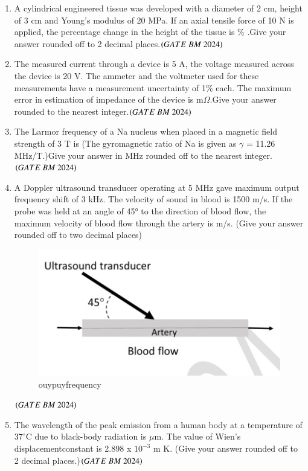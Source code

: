 \documentclass[journal,12pt,onecolumn]{IEEEtran}
\theoremstyle{remark}
\begin{document}
\begin{enumerate}
\item A cylindrical engineered tissue was developed with a diameter of 2 cm, height of 3 cm and Young's modulus of 20 MPa. If an axial tensile force of 10 N is applied, the percentage change in the height of the tissue is  \underline{\hspace{2cm}} \% .Give your answer
rounded off to 2 decimal places.\hfill $\brak{GATE\ BM\ 2024}$

\item The measured current through a device is 5 A, the voltage measured across the device is 20 V. The ammeter and the voltmeter used for these measurements have a measurement uncertainty of 1\% each. The maximum error in estimation of impedance of the device is\underline{\hspace{2cm}} m$\Omega$.Give your answer rounded to the nearest integer.\hfill $\brak{GATE\ BM\ 2024}$

\item The Larmor frequency of a Na nucleus when placed in a magnetic field strength of 3 T is  \underline{\hspace{2cm}} (The gyromagnetic ratio of Na is given as $\gamma$ = 11.26 MHz/T.)Give your answer in MHz rounded off to the nearest integer.\hfill $\brak{GATE\ BM\ 2024}$

\item A Doppler ultrasound transducer operating at 5 MHz gave maximum output frequency shift of 3 kHz. The velocity of sound in blood is 1500 m/s. If the probe was held at an angle of 45° to the direction of blood flow, the maximum velocity of blood flow through the artery is \underline{\hspace{2cm}}m/s. (Give your answer rounded off to two decimal places)
\begin{figure}[H]
\centering
\includegraphics[width=0.4\columnwidth]{Figs/Fig 5.png}
\caption{ouypuyfrequency}
\label{fig:placeholder}
\end{figure}\hfill $\brak{GATE\ BM\ 2024}$

\item The wavelength of the peak emission from a human body at a temperature of $37^\circ\text{C}$
 due to black-body radiation is \underline{\hspace{2cm}} $\mu$m. The value of Wien's displacementconstant is 2.898 x $10^{-3}$ m K. (Give your answer rounded off to 2 decimal places.)\hfill $\brak{GATE\ BM\ 2024}$


\end{enumerate}
\end{document}
